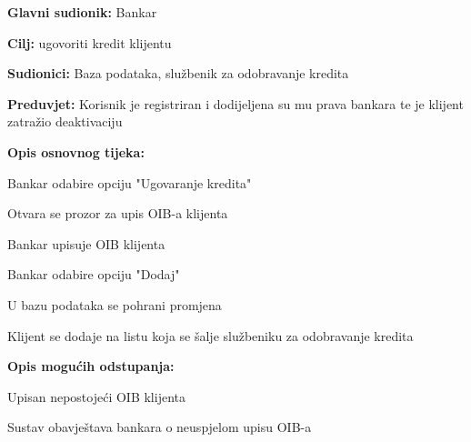                 
                
                 \noindent {}
                \begin{packed_item}
                	
                	\item \textbf{Glavni sudionik: }Bankar
                	\item  \textbf{Cilj:} ugovoriti kredit klijentu
                	\item  \textbf{Sudionici:} Baza podataka, službenik za odobravanje kredita
                	\item  \textbf{Preduvjet:} Korisnik je registriran i dodijeljena su mu prava bankara te je klijent zatražio deaktivaciju
                	\item  \textbf{Opis osnovnog tijeka:}
                	
                	\item[] \begin{packed_enum}
                		
                		\item Bankar odabire opciju "Ugovaranje kredita"
                		\item Otvara se prozor za upis OIB-a klijenta
                		\item Bankar upisuje OIB klijenta 
                		\item Bankar odabire opciju "Dodaj"
                		\item U bazu podataka se pohrani promjena 
                		\item Klijent se dodaje na listu koja se šalje službeniku za odobravanje kredita
                	\end{packed_enum}
                	
                	\item  \textbf{Opis mogućih odstupanja:} 
                	
                	\item[] \begin{packed_item}
                		
                		\item[2.a] Upisan nepostojeći OIB klijenta
                		\item[] \begin{packed_enum}
                			
                			\item Sustav obavještava bankara o neuspjelom upisu OIB-a
                			
                		\end{packed_enum}
                		
                	\end{packed_item}
                \end{packed_item}
            
